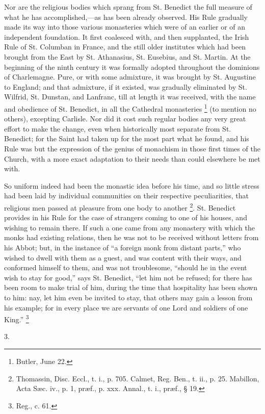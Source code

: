 Nor are the religious bodies which sprang from St. Benedict the
full measure of what he has accomplished,—as has been already
observed. His Rule gradually made its way into those various
monasteries which were of an earlier or of an independent foundation.
It first coalesced with, and then supplanted, the Irish Rule of St.
Columban in France, and the still older institutes which had been
brought from the East by St. Athanasius, St. Eusebius, and St. Martin.
At the beginning of the ninth century it was formally adopted
throughout the dominions of Charlemagne. Pure, or with some admixture,
it was brought by St. Augustine to England; and that admixture, if it
existed, was gradually eliminated by St. Wilfrid, St. Dunstan, and
Lanfranc, till at length it was received, with the name and obedience
of St. Benedict, in all the Cathedral monasteries \footnote{Butler, June
22.} (to mention no others), excepting Carlisle. Nor did it cost
such regular bodies any very great effort to make the change, even
when historically most separate from St. Benedict; for the Saint had
taken up for the most part what he found, and his Rule was but the
expression of the genius of monachism in those first times of the
Church, with a more exact adaptation to their needs than could
elsewhere be met with.

So uniform indeed had been the monastic idea before his time, and
so little stress had been laid by individual communities on their
respective peculiarities, that religious men passed at pleasure from
one body to another \footnote{Thomassin,
Disc. Eccl., t. i., p. 705. Calmet, Reg. Ben., t. ii., p. 25. Mabillon,
Acta Sæc. iv., p. 1, præf., p. xxx. Annal., t. i., præf., § 19.}. St.
Benedict provides in his Rule for the case of strangers coming to one
of his houses, and wishing to remain there. If such a one came from
any monastery with which the monks had existing relations, then he was
not to be received without letters from his Abbot; but, in the
instance of ``a foreign monk from distant parts,'' who wished
to dwell with them as a guest, and was content with their ways, and
conformed himself to them, and was not troublesome, ``should he in
the event wish to stay for good,'' says St. Benedict, ``let
him not be refused; for there has been room to make trial of him,
during the time that hospitality has been shown to him: nay, let him
even be invited to stay, that others may gain a lesson from his
example; for in every place we are servants of one Lord and soldiers
of one King.'' \footnote{Reg., c. 61.}

3.

